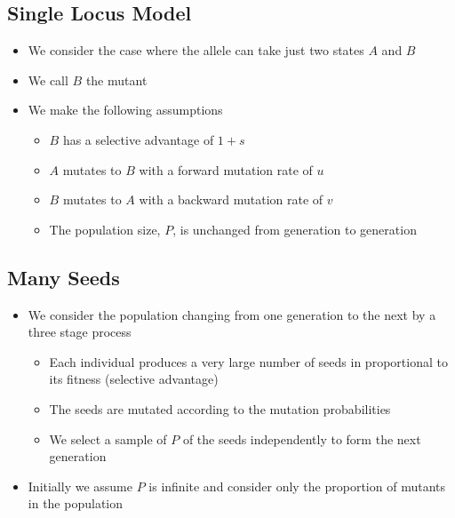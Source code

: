 \Outline %

\begin{slide}
\section[-1]{Single Locus Model}

\begin{PauseHighLight}
  \begin{itemize}
  \item We consider the case where the allele can take just two states
    $A$ and $B$\pause
  \item We call $B$ the mutant\pause
  \item We make the following assumptions
    \begin{itemize}\squeeze
    \item $B$ has a selective advantage of $1+s$\pause
    \item $A$ mutates to $B$ with a forward mutation rate of $u$\pause
    \item $B$ mutates to $A$ with a backward mutation rate of $v$\pause
    \item The population size, $P$, is unchanged from generation to generation\pause
    \end{itemize}
  \end{itemize}
\end{PauseHighLight}

\end{slide}


\begin{slide}
\section[-1]{Many Seeds}

\begin{PauseHighLight}
  \begin{itemize}
  \item We consider the population changing from one generation to the
    next by a three stage process\pause
    \begin{itemize}
    \item Each individual produces a very large number of seeds in
      proportional to its fitness (selective advantage)\pause
    \item The seeds are mutated according to the mutation
      probabilities\pause
    \item We select a sample of $P$ of the seeds independently to form
      the next generation\pause
    \end{itemize}
  \item Initially we assume $P$ is infinite and consider only the
    proportion of mutants in the population\pause
  \end{itemize}
\end{PauseHighLight}
\end{slide}

